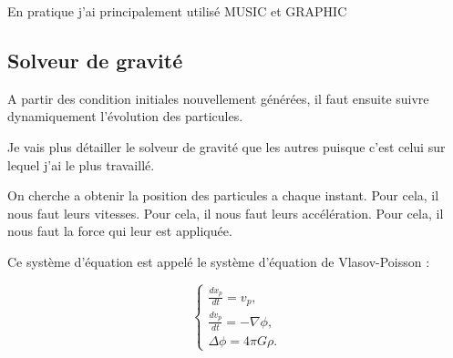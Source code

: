 En pratique j'ai principalement utilisé MUSIC et GRAPHIC %




%
%

%
%





\subsection{Solveur de gravité}

A partir des condition initiales nouvellement générées, il faut ensuite suivre dynamiquement l'évolution des particules.

Je vais plus détailler le solveur de gravité que les autres puisque c'est celui sur lequel j'ai le plus travaillé.

On cherche a obtenir la position des particules a chaque instant.
Pour cela, il nous faut leurs vitesses.
Pour cela, il nous faut leurs accélération.
Pour cela, il nous faut la force qui leur est appliquée.

Ce système d'équation est appelé le système d'équation de Vlasov-Poisson :

\begin{equation}
\begin{cases}

\frac{d{x}_p}{dt} = { v}_p, \\
\frac{d{ v}_p}{dt} = -\nabla \phi , \\
\Delta \phi= 4\pi G \rho.

\end{cases}
\label{eq:Ncorps}
\end{equation}

